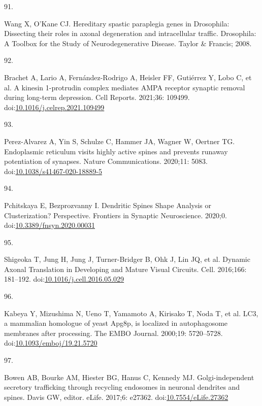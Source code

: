 \documentclass[
  12pt,
  a4paper,
]{book}
\newlength{\cslhangindent}
\newlength{\csllabelwidth}
\newlength{\cslentryspacingunit} %
\newenvironment{CSLReferences}[2] %
 {%
  \setlength{\parindent}{0pt}
  \ifodd #1
  \let\oldpar\par
  \def\par{\hangindent=\cslhangindent\oldpar}
  \fi
  \setlength{\parskip}{#2\cslentryspacingunit}
 }%
 {}
\newcommand{\CSLLeftMargin}[1]{\parbox[t]{\csllabelwidth}{#1}}
\newcommand{\CSLRightInline}[1]{\parbox[t]{\linewidth - \csllabelwidth}{#1}\break}
\begin{document}
\begin{CSLReferences}{0}{0}
\leavevmode{}%
\CSLLeftMargin{91. }%
\CSLRightInline{Wang X, O'Kane CJ. Hereditary spastic paraplegia genes in {Drosophila}: Dissecting their roles in axonal degeneration and intracellular traffic. Drosophila: {A Toolbox} for the {Study} of {Neurodegenerative Disease}. {Taylor \& Francis}; 2008. }

\leavevmode{}%
\CSLLeftMargin{92. }%
\CSLRightInline{Brachet A, Lario A, Fernández-Rodrigo A, Heisler FF, Gutiérrez Y, Lobo C, et al. A kinesin 1-protrudin complex mediates {AMPA} receptor synaptic removal during long-term depression. Cell Reports. 2021;36: 109499. doi:\href{https://doi.org/10.1016/j.celrep.2021.109499}{10.1016/j.celrep.2021.109499}}

\leavevmode{}%
\CSLLeftMargin{93. }%
\CSLRightInline{Perez-Alvarez A, Yin S, Schulze C, Hammer JA, Wagner W, Oertner TG. Endoplasmic reticulum visits highly active spines and prevents runaway potentiation of synapses. Nature Communications. 2020;11: 5083. doi:\href{https://doi.org/10.1038/s41467-020-18889-5}{10.1038/s41467-020-18889-5}}

\leavevmode{}%
\CSLLeftMargin{94. }%
\CSLRightInline{Pchitskaya E, Bezprozvanny I. Dendritic {Spines Shape Analysis}\textemdash{{Classification}} or {Clusterization}? {Perspective}. Frontiers in Synaptic Neuroscience. 2020;0. doi:\href{https://doi.org/10.3389/fnsyn.2020.00031}{10.3389/fnsyn.2020.00031}}

\leavevmode{}%
\CSLLeftMargin{95. }%
\CSLRightInline{Shigeoka T, Jung H, Jung J, Turner-Bridger B, Ohk J, Lin JQ, et al. Dynamic {Axonal Translation} in {Developing} and {Mature Visual Circuits}. Cell. 2016;166: 181--192. doi:\href{https://doi.org/10.1016/j.cell.2016.05.029}{10.1016/j.cell.2016.05.029}}

\leavevmode{}%
\CSLLeftMargin{96. }%
\CSLRightInline{Kabeya Y, Mizushima N, Ueno T, Yamamoto A, Kirisako T, Noda T, et al. {LC3}, a mammalian homologue of yeast {Apg8p}, is localized in autophagosome membranes after processing. The EMBO Journal. 2000;19: 5720--5728. doi:\href{https://doi.org/10.1093/emboj/19.21.5720}{10.1093/emboj/19.21.5720}}

\leavevmode{}%
\CSLLeftMargin{97. }%
\CSLRightInline{Bowen AB, Bourke AM, Hiester BG, Hanus C, Kennedy MJ. Golgi-independent secretory trafficking through recycling endosomes in neuronal dendrites and spines. Davis GW, editor. eLife. 2017;6: e27362. doi:\href{https://doi.org/10.7554/eLife.27362}{10.7554/eLife.27362}}


\end{CSLReferences}
\end{document}
